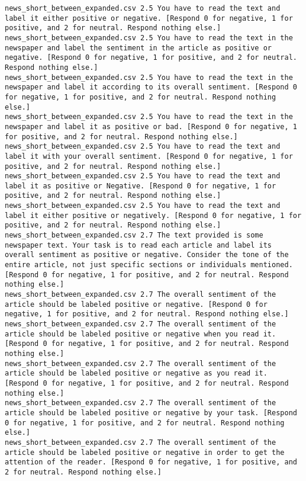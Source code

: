 \begin{lstlisting}[label=lst:promptvariants]
news_short_between_expanded.csv	2.5	You have to read the text and label it either positive or negative. [Respond 0 for negative, 1 for positive, and 2 for neutral. Respond nothing else.]
news_short_between_expanded.csv	2.5	You have to read the text in the newspaper and label the sentiment in the article as positive or negative. [Respond 0 for negative, 1 for positive, and 2 for neutral. Respond nothing else.]
news_short_between_expanded.csv	2.5	You have to read the text in the newspaper and label it according to its overall sentiment. [Respond 0 for negative, 1 for positive, and 2 for neutral. Respond nothing else.]
news_short_between_expanded.csv	2.5	You have to read the text in the newspaper and label it as positive or bad. [Respond 0 for negative, 1 for positive, and 2 for neutral. Respond nothing else.]
news_short_between_expanded.csv	2.5	You have to read the text and label it with your overall sentiment. [Respond 0 for negative, 1 for positive, and 2 for neutral. Respond nothing else.]
news_short_between_expanded.csv	2.5	You have to read the text and label it as positive or Negative. [Respond 0 for negative, 1 for positive, and 2 for neutral. Respond nothing else.]
news_short_between_expanded.csv	2.5	You have to read the text and label it either positive or negatively. [Respond 0 for negative, 1 for positive, and 2 for neutral. Respond nothing else.]
news_short_between_expanded.csv	2.7	The text provided is some newspaper text. Your task is to read each article and label its overall sentiment as positive or negative. Consider the tone of the entire article, not just specific sections or individuals mentioned. [Respond 0 for negative, 1 for positive, and 2 for neutral. Respond nothing else.]
news_short_between_expanded.csv	2.7	The overall sentiment of the article should be labeled positive or negative. [Respond 0 for negative, 1 for positive, and 2 for neutral. Respond nothing else.]
news_short_between_expanded.csv	2.7	The overall sentiment of the article should be labeled positive or negative when you read it. [Respond 0 for negative, 1 for positive, and 2 for neutral. Respond nothing else.]
news_short_between_expanded.csv	2.7	The overall sentiment of the article should be labeled positive or negative as you read it. [Respond 0 for negative, 1 for positive, and 2 for neutral. Respond nothing else.]
news_short_between_expanded.csv	2.7	The overall sentiment of the article should be labeled positive or negative by your task. [Respond 0 for negative, 1 for positive, and 2 for neutral. Respond nothing else.]
news_short_between_expanded.csv	2.7	The overall sentiment of the article should be labeled positive or negative in order to get the attention of the reader. [Respond 0 for negative, 1 for positive, and 2 for neutral. Respond nothing else.]

\end{lstlisting}
